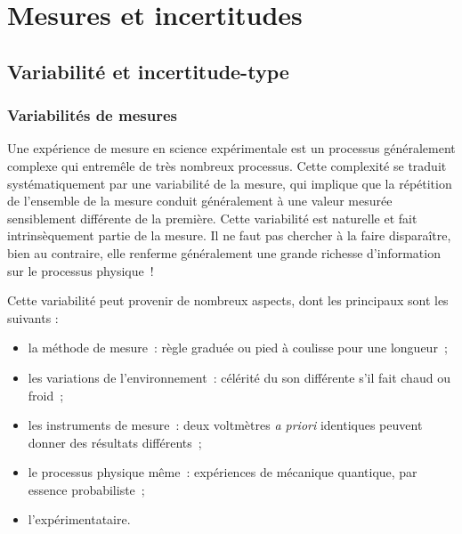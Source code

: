 \documentclass[../main/main.tex]{subfiles}
\begin{document}
\setcounter{chapter}{-1}

\chapter{Mesures et incertitudes}


\section{Variabilité et incertitude-type}
\subsection{Variabilités de mesures}
Une expérience de mesure en science expérimentale est un processus généralement
complexe qui entremêle de très nombreux processus. Cette complexité se traduit
systématiquement par une variabilité de la mesure, qui implique que la
répétition de l'ensemble de la mesure conduit généralement à une valeur mesurée
sensiblement différente de la première. Cette variabilité est naturelle et fait
intrinsèquement partie de la mesure. Il ne faut pas chercher à la faire
disparaître, bien au contraire, elle renferme généralement une grande richesse
d'information sur le processus physique~!

Cette variabilité peut provenir de nombreux aspects, dont les principaux sont
les suivants :
\begin{itemize}[label=$\diamond$, leftmargin=10pt]
	\item la méthode de mesure~: règle graduée ou pied à coulisse pour une
	      longueur~;
	\item les variations de l'environnement~: célérité du son différente s'il fait
	      chaud ou froid~;
	\item les instruments de mesure~: deux voltmètres \textit{a priori} identiques
	      peuvent donner des résultats différents~;
	\item le processus physique même~: expériences de mécanique quantique, par
	      essence probabiliste~;
	\item l'expérimentataire.
\end{itemize}
\end{document}
